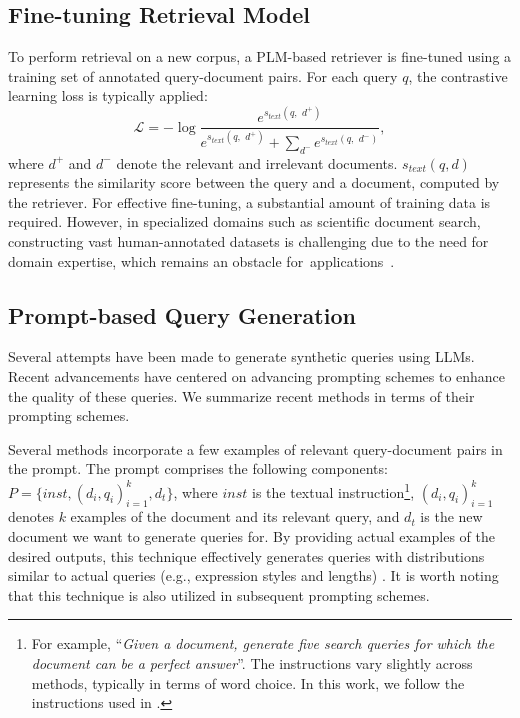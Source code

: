 \subsection{Fine-tuning Retrieval Model}
To perform retrieval on a new corpus, a PLM-based retriever is fine-tuned using a training set of annotated query-document pairs.
For each query $q$, the contrastive learning loss is typically applied:
\begin{equation}
    \mathcal{L} = -\log\frac{e^{s_{text}(q,\,\, d^+)}}{e^{s_{text}(q,\,\, d^+)} + \sum_{d^-} e^{s_{text}(q,\,\, d^-)}},
\end{equation}
where $d^+$ and $d^-$ denote the relevant and irrelevant documents. 
$s_{text}(q, d)$ represents the similarity score between the query and a document, computed by the retriever.
For effective fine-tuning, a substantial amount of training data is required. 
However, in specialized domains such as scientific document search, constructing vast human-annotated datasets is challenging due to the need for domain expertise, which remains an obstacle for~applications~\cite{li2023sailer, ToTER}.


\subsection{Prompt-based Query Generation}
\label{prelim:qgen}
Several attempts have been made to generate synthetic queries using LLMs. 
Recent advancements have centered on advancing prompting schemes to enhance the quality of these queries.
We summarize recent methods in terms of their prompting schemes.

Several methods \cite{inpars, inpars2, dai2022promptagator, pairwise_qgen, label_condition_qgen, saad2023udapdr} incorporate a few examples of relevant query-document pairs in the prompt.
The prompt comprises the following components: $P = \{inst, (d_i, q_i)^k_{i=1}, d_t\}$, 
where $inst$ is the textual instruction\footnote{For example, ``\textit{Given a document, generate five search queries for which the document can be a perfect answer}''. 
The instructions vary slightly across methods, typically in terms of word choice.
In this work, we follow the instructions used in \cite{pairwise_qgen}.
}, 
$(d_i, q_i)^k_{i=1}$ denotes $k$ examples of the document and its relevant query, 
and $d_t$ is the new document we want to generate queries for.
By providing actual examples of the desired outputs, this technique effectively generates queries with distributions similar to actual queries (e.g., expression styles and lengths) \cite{dai2022promptagator}.
It is worth noting that this technique is also utilized in subsequent prompting schemes.

